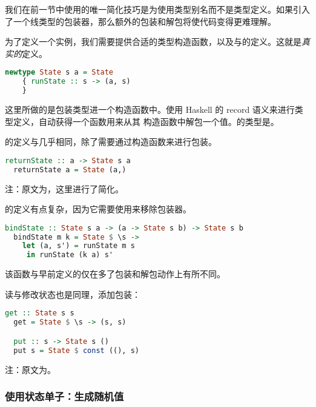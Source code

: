 \documentclass[./main.tex]{subfiles}
\begin{document}
我们在前一节中使用的唯一简化技巧是为使用类型别名而不是类型定义。如果引入了一个线类型的包装器，那么额外的包装和解包将使代码变得更难理解。

为了定义一个实例，我们需要提供合适的类型构造函数，以及\acode{(>>=)}与的定义。这就是\textit{真实的}定义。

\begin{lstlisting}[language=Haskell]
  newtype State s a = State
    { runState :: s -> (a, s)
    }
\end{lstlisting}

这里所做的是包装类型进一个构造函数中。使用 Haskell 的 record 语义来进行类型定义，自动获得一个函数用来从其
构造函数中解包一个值。的类型是。

的定义与几乎相同，除了需要通过构造函数来进行包装。

\begin{lstlisting}[language=Haskell]
  returnState :: a -> State s a
  returnState a = State (a,)
\end{lstlisting}

注：原文为，这里进行了简化。

\acode{(>>=)}的定义有点复杂，因为它需要使用来移除包装器。

\begin{lstlisting}[language=Haskell]
  bindState :: State s a -> (a -> State s b) -> State s b
  bindState m k = State $ \s ->
    let (a, s') = runState m s
     in runState (k a) s'
\end{lstlisting}

该函数与早前定义的仅在多了包装和解包动作上有所不同。

读与修改状态也是同理，添加包装：

\begin{lstlisting}[language=Haskell]
  get :: State s s
  get = State $ \s -> (s, s)

  put :: s -> State s ()
  put s = State $ const ((), s)
\end{lstlisting}

注：原文为。

\subsubsection*{使用状态单子：生成随机值}
\end{document}
